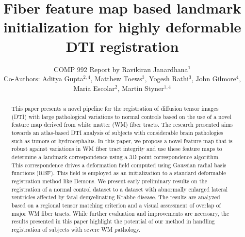 \documentclass{llncs}
\begin{document}
%
\frontmatter          %
%
\pagestyle{headings}  %
\mainmatter              %
%
\title{Fiber feature map based landmark initialization for highly deformable DTI registration}
\author{COMP 992 Report by Ravikiran Janardhana$^{1}$ \\ \vspace{2mm} Co-Authors: Aditya Gupta$^{2,4}$, Matthew Toews$^{3}$, Yogesh Rathi$^{3}$, John Gilmore$^{4}$, Maria Escolar$^{2}$, Martin Styner$^{1,4}$}



\maketitle              %


\begin{abstract}
This paper presents a novel pipeline for the registration of diffusion tensor images (DTI) with large pathological variations to normal controls based on the use of a novel feature map derived from white matter (WM) fiber tracts. The research presented aims towards an atlas-based DTI analysis of subjects with considerable brain pathologies such as  tumors or hydrocephalus. In this paper, we propose a novel feature map that is robust against variations in WM fiber tract integrity and use these feature maps to determine a landmark correspondence using a 3D point correspondence algorithm. This correspondence drives a deformation field computed using Gaussian radial basis functions (RBF). This field is employed as an initialization to a standard deformable registration method like Demons. We present early preliminary results on  the registration of a normal control dataset to a dataset with abnormally enlarged lateral ventricles affected by  fatal demyelinating Krabbe disease. The results are analyzed based on a regional tensor matching criterion and a visual assessment of overlap of major WM fiber tracts. While further evaluation and improvements are necessary, the results presented in this paper highlight the potential of our method in handling registration of subjects with severe WM pathology.

\end{abstract}
\end{document}
